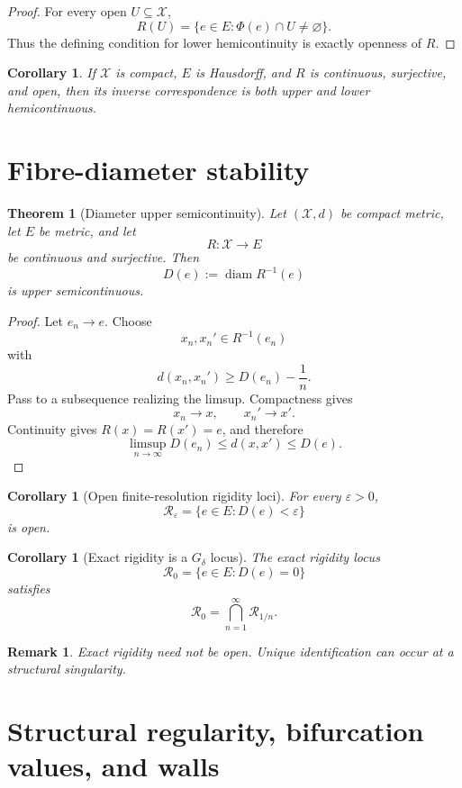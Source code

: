 \documentclass[11pt]{article}
\newtheorem{theorem}[definition]{Theorem}
\newtheorem{corollary}[definition]{Corollary}
\newtheorem{remark}[definition]{Remark}
\newcommand{\X}{\mathcal X}
\begin{document}
\begin{proof}
For every open \(U\subseteq\X\),
\[
R(U)
=
\{e\in E:\Phi(e)\cap U\neq\varnothing\}.
\]
Thus the defining condition for lower hemicontinuity is exactly openness of
\(R\).
\end{proof}

\begin{corollary}
If \(\X\) is compact, \(E\) is Hausdorff, and \(R\) is continuous, surjective,
and open, then its inverse correspondence is both upper and lower
hemicontinuous.
\end{corollary}

\section{Fibre-diameter stability}

\begin{theorem}[Diameter upper semicontinuity]
\label{thm:diam-usc}
Let \((\X,d)\) be compact metric, let \(E\) be metric, and let
\[
R:\X\to E
\]
be continuous and surjective. Then
\[
D(e):=\operatorname{diam}R^{-1}(e)
\]
is upper semicontinuous.
\end{theorem}

\begin{proof}
Let \(e_n\to e\). Choose
\[
x_n,x_n'\in R^{-1}(e_n)
\]
with
\[
d(x_n,x_n')
\ge D(e_n)-\frac1n.
\]
Pass to a subsequence realizing the limsup. Compactness gives
\[
x_n\to x,\qquad x_n'\to x'.
\]
Continuity gives \(R(x)=R(x')=e\), and therefore
\[
\limsup_{n\to\infty}D(e_n)
\le d(x,x')
\le D(e).
\]
\end{proof}

\begin{corollary}[Open finite-resolution rigidity loci]
For every \(\varepsilon>0\),
\[
\mathcal R_\varepsilon
=
\{e\in E:D(e)<\varepsilon\}
\]
is open.
\end{corollary}

\begin{corollary}[Exact rigidity is a \(G_\delta\) locus]
The exact rigidity locus
\[
\mathcal R_0
=
\{e\in E:D(e)=0\}
\]
satisfies
\[
\mathcal R_0
=
\bigcap_{n=1}^{\infty}\mathcal R_{1/n}.
\]
\end{corollary}

\begin{remark}
Exact rigidity need not be open. Unique identification can occur at a
structural singularity.
\end{remark}

\section{Structural regularity, bifurcation values, and walls}
\end{document}
